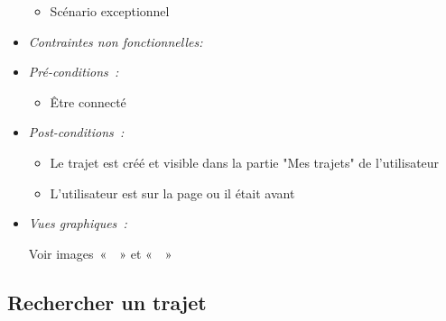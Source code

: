 \begin{itemize}
\begin{itemize}
    \item Scénario exceptionnel
\end{itemize}

\item \textit{Contraintes non fonctionnelles:}

\item \textit{Pré-conditions~:}

    \begin{itemize}
        \item Être connecté
    \end{itemize}

\item \textit{Post-conditions~:}
        \begin{itemize}
        \item Le trajet est créé et visible dans la partie "Mes trajets" de l'utilisateur
        \item L'utilisateur est sur la page ou il était avant
    \end{itemize}
    
\item \textit{Vues graphiques~:}

Voir images~«~~» et 
«~~»

\end{itemize}

\subsection{Rechercher un trajet}\label{subsec:rechercher-un-trajet}

